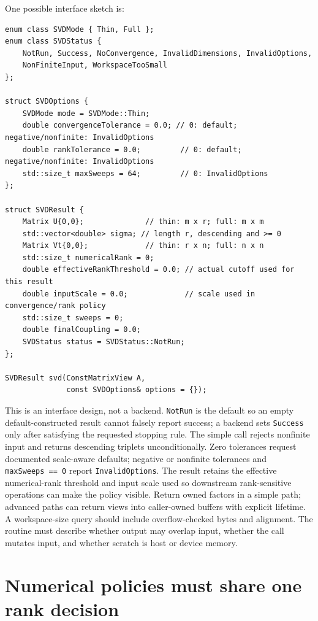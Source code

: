 One possible interface sketch is:

\begin{verbatim}
enum class SVDMode { Thin, Full };
enum class SVDStatus {
    NotRun, Success, NoConvergence, InvalidDimensions, InvalidOptions,
    NonFiniteInput, WorkspaceTooSmall
};

struct SVDOptions {
    SVDMode mode = SVDMode::Thin;
    double convergenceTolerance = 0.0; // 0: default; negative/nonfinite: InvalidOptions
    double rankTolerance = 0.0;         // 0: default; negative/nonfinite: InvalidOptions
    std::size_t maxSweeps = 64;         // 0: InvalidOptions
};

struct SVDResult {
    Matrix U{0,0};              // thin: m x r; full: m x m
    std::vector<double> sigma; // length r, descending and >= 0
    Matrix Vt{0,0};             // thin: r x n; full: n x n
    std::size_t numericalRank = 0;
    double effectiveRankThreshold = 0.0; // actual cutoff used for this result
    double inputScale = 0.0;             // scale used in convergence/rank policy
    std::size_t sweeps = 0;
    double finalCoupling = 0.0;
    SVDStatus status = SVDStatus::NotRun;
};

SVDResult svd(ConstMatrixView A,
              const SVDOptions& options = {});
\end{verbatim}

This is an interface design, not a backend. \texttt{NotRun} is the default so an empty default-constructed result cannot falsely report success; a backend sets \texttt{Success} only after satisfying the requested stopping rule. The simple call rejects nonfinite input and returns descending triplets unconditionally. Zero tolerances request documented scale-aware defaults; negative or nonfinite tolerances and \texttt{maxSweeps\ ==\ 0} report \texttt{InvalidOptions}. The result retains the effective numerical-rank threshold and input scale used so downstream rank-sensitive operations can make the policy visible. Return owned factors in a simple path; advanced paths can return views into caller-owned buffers with explicit lifetime. A workspace-size query should include overflow-checked bytes and alignment. The routine must describe whether output may overlap input, whether the call mutates input, and whether scratch is host or device memory.

\section{Numerical policies must share one rank decision}\label{02-foundations-ii-ch038-numerical-policies-must-share-one-rank-decision}

